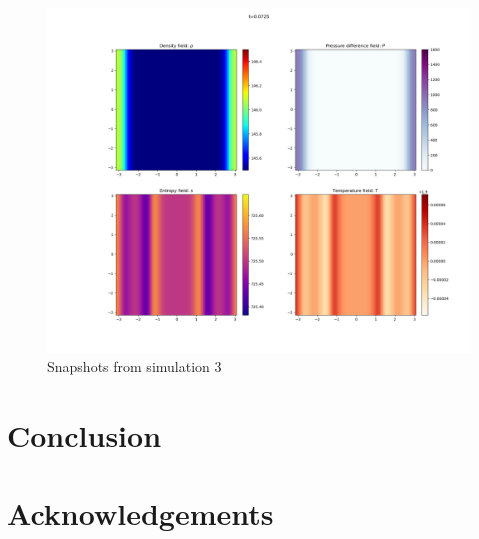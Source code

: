 \documentclass{article}
\begin{document}
\begin{figure}[h]
    \includegraphics[width=\textwidth/3]{Sim 2/SF02_0029.png}
    \caption{Snapshots from simulation 3}
    \label{sim3}
\end{figure}

\section{Conclusion}

 
\section{Acknowledgements}



\end{document}
